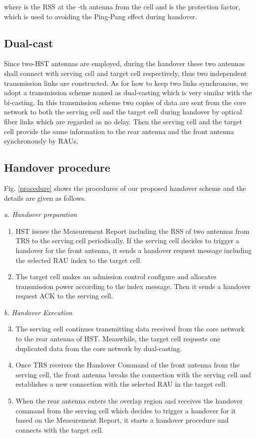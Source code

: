 \documentclass[a4paper,twocolumn,10pt]{IEEEtran}
\begin{document}
where  is the RSS at the -th antenna from the cell  and  is the protection factor, which is used to avoiding the Ping-Pang effect during handover.

\subsection{Dual-cast}
Since two-HST antennas are employed, during the handover these two antennas shall connect with serving cell and target cell respectively, thus two independent transmission links are constructed.  As for how to keep two links synchronous, we adopt a transmission scheme named as dual-casting which is very similar with the bi-casting\textcolor[rgb]{0,0,0}{\cite{bi-casting}}. In this transmission scheme two copies of data are sent from the core network to both the serving cell and the target cell during handover by optical fiber links which are regarded as no delay. Then the serving cell and the target cell provide the same information to the rear antenna and the front antenna synchronously by RAUs.

\subsection{Handover procedure}
Fig. \ref{procedure} shows the procedures of our proposed handover scheme and the details are given as follows.

\emph{a. Handover preparation}

\begin{enumerate}
\item HST issues the Measurement Report including the RSS of two antennas from TRS to the serving cell periodically. If the serving cell decides to trigger a handover for the front antenna, it sends a handover request message including the selected RAU index to the target cell.
\item The target cell makes an admission control  configure and allocates transmission power according to the index message. Then it sends a handover request ACK to the serving cell.
\end{enumerate}

\emph{b. Handover Execution}

\begin{enumerate}
\setcounter{enumi}{2}
\item The serving cell continues transmitting data received from the core network to the rear antenna of HST. Meanwhile, the target cell requests one duplicated data from the core network by dual-casting.
\item Once TRS receives the Handover Command of the front antenna from the serving cell, the front antenna breaks the connection with the serving cell and establishes a new connection with the selected RAU in the target cell.
\item When the rear antenna enters the overlap region and receives the handover command from the serving cell which decides to trigger a handover for it based on the Measurement Report, it starts a handover procedure and connects with the target cell.

\end{enumerate}
\end{document}

